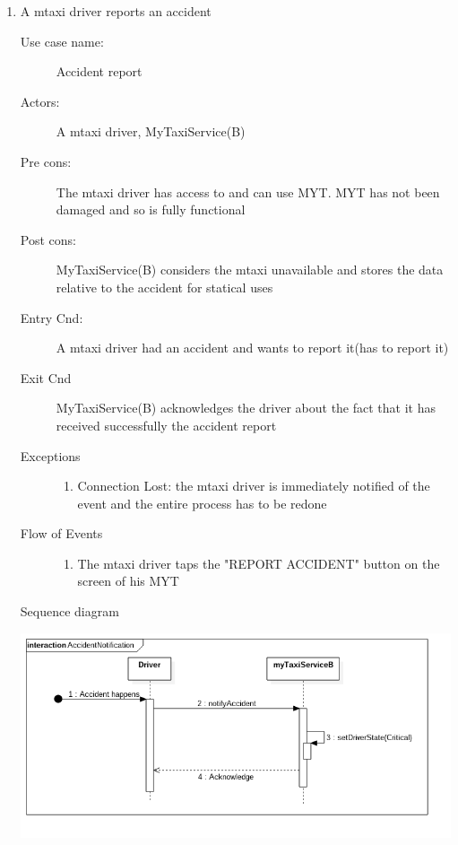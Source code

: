 \documentclass[11pt,titlepage]{article} %
\begin{document}
\begin{enumerate}
	
	      \item A mtaxi driver reports an accident
		\begin{description}
		        \item [Use case name:] Accident report
		        \item [Actors:] A mtaxi driver, MyTaxiService(B)
		        \item [Pre cons:] The mtaxi driver has access to and can use MYT. MYT has not been damaged and so
		        is fully functional
		        \item [Post cons:] MyTaxiService(B) considers the mtaxi unavailable and stores the data
		        relative to the accident for statical uses
		        \item [Entry Cnd:] A mtaxi driver had an accident and wants to report it(has to report it)
		        \item [Exit Cnd] MyTaxiService(B) acknowledges the driver about the fact that it has received
		        successfully the accident report
		        \item [Exceptions]\hfill
			\begin{enumerate}
			          \item Connection Lost: the mtaxi driver is immediately notified of the event and the entire process has to be redone
			\end{enumerate}
		       \item [Flow of Events]\hfill
			\begin{enumerate}
			          \item The mtaxi driver taps the "REPORT ACCIDENT" button on the screen of his MYT
			\end{enumerate}
		\end{description}
		Sequence diagram
		\begin{center}
		\includegraphics[scale=0.52]{usecase11.png}
		\end{center}
	

\end{enumerate}
\end{document}
